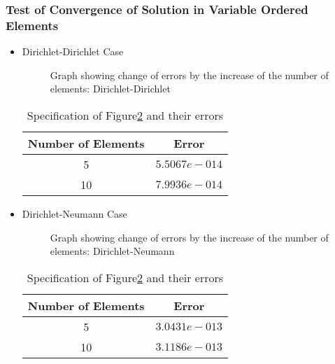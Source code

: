 
\subsubsection{Test of Convergence of Solution in Variable Ordered
Elements}



\begin{itemize}

\item Dirichlet-Dirichlet Case
\begin{figure}[h]
\begin{center}
\caption{\label{ScrvPconv}Graph showing change of errors by the
increase of the number of elements: Dirichlet-Dirichlet}
\end{center}
\end{figure}

\begin{table}[h]
\centering \caption{\label{ScrvPconvt} Specification of
                              Figure\ref{ScrvPconv} and their errors}
\begin{tabular}{|c|c|} \hline
Number of Elements&Error   \\ \hline \hline
    5&$5.5067e-014$  \\ \hline
    10&$7.9936e-014$  \\ \hline
\end{tabular}
\end{table}


\item Dirichlet-Neumann Case

\begin{figure}[h]
\begin{center}
\caption{\label{ScrvPconv}Graph showing change of errors by the
increase of the number of elements: Dirichlet-Neumann}
\end{center}
\end{figure}

\begin{table}[h]
\centering \caption{\label{ScrvPconvt} Specification of
                              Figure\ref{ScrvPconv} and their errors}
\begin{tabular}{|c|c|} \hline
Number of Elements&Error   \\ \hline \hline
    5&$3.0431e-013$  \\ \hline
    10&$3.1186e-013$ \\ \hline
\end{tabular}

\end{table}


\end{itemize}
